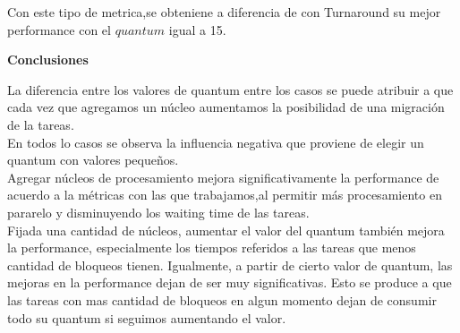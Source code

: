    \indent Con este tipo de metrica,se obteniene a diferencia de con Turnaround  su mejor
   performance con el $quantum$ igual a 15.\\
  
 \begin{center}
  \textbf{Conclusiones}
 \end{center}


\indent \indent La diferencia entre los valores de quantum entre los casos se puede atribuir a que cada vez que 
agregamos un núcleo aumentamos la posibilidad de una migración de la tareas.\\
\indent \indent En todos lo casos se observa la influencia negativa que proviene de elegir un quantum con valores pequeños.\\
\indent \indent Agregar núcleos de procesamiento mejora significativamente la performance de acuerdo a la métricas con las que
trabajamos,al permitir más procesamiento en pararelo y disminuyendo los waiting time de las tareas.\\
\indent \indent  Fijada una cantidad de núcleos, aumentar el valor del quantum también mejora la performance, 
especialmente los tiempos referidos a las tareas que menos cantidad de bloqueos tienen. 
Igualmente, a partir de cierto valor de quantum, las mejoras en la performance dejan de ser muy significativas. 
Esto se produce a que las tareas con mas cantidad de bloqueos en algun momento dejan de consumir todo
su quantum si seguimos aumentando el valor. 
 
 
 
